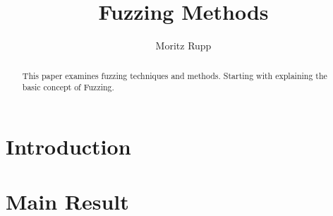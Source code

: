 \documentclass[journal=tosc,submission]{iacrtrans}
\author{Moritz Rupp}
\institute{
  Hoschule Albstadt-Sigmaringen, Albstadt, Germany, \email{ruppmori@hs-albsig.de}
  
}
\title{Fuzzing Methods}
\begin{document}
\maketitle





\begin{abstract}
 This paper examines fuzzing techniques and methods. Starting with explaining the basic concept of Fuzzing. 
 
\end{abstract}


\section{Introduction}



\section{Main Result}





\end{document}
